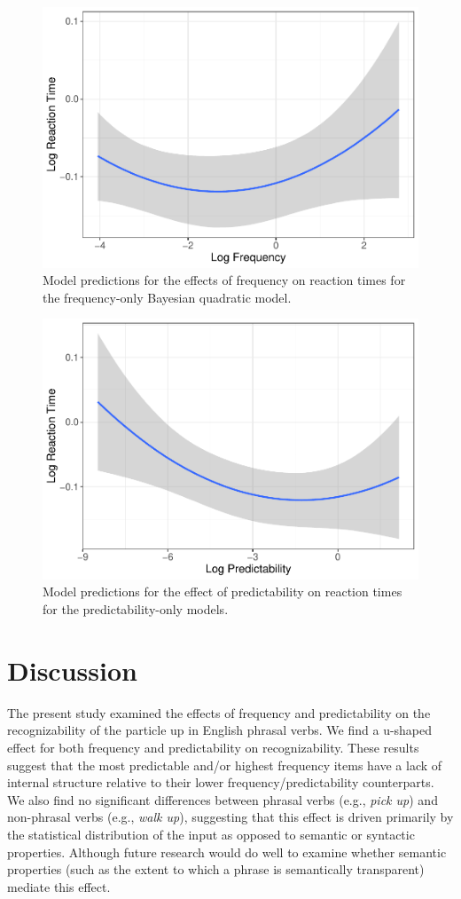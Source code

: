 \documentclass[
  man,floatsintext]{apa6}
\begin{document}
\begin{figure}

{\centering \includegraphics[width=0.6\linewidth]{write-up_files/figure-latex/FreqOnlyPlot-1} 

}

\caption{Model predictions for the effects of frequency on reaction times for the frequency-only Bayesian quadratic model.}\label{fig:FreqOnlyPlot}
\end{figure}

\begin{figure}

{\centering \includegraphics[width=0.6\linewidth]{write-up_files/figure-latex/PredicOnlyPlot-1} 

}

\caption{Model predictions for the effect of predictability on reaction times for the predictability-only models.}\label{fig:PredicOnlyPlot}
\end{figure}

\hypertarget{discussion}{%
\section{Discussion}\label{discussion}}

The present study examined the effects of frequency and predictability on the recognizability of the particle up in English phrasal verbs. We find a u-shaped effect for both frequency and predictability on recognizability. These results suggest that the most predictable and/or highest frequency items have a lack of internal structure relative to their lower frequency/predictability counterparts. We also find no significant differences between phrasal verbs (e.g., \emph{pick up}) and non-phrasal verbs (e.g., \emph{walk up}), suggesting that this effect is driven primarily by the statistical distribution of the input as opposed to semantic or syntactic properties. Although future research would do well to examine whether semantic properties (such as the extent to which a phrase is semantically transparent) mediate this effect.
\end{document}
